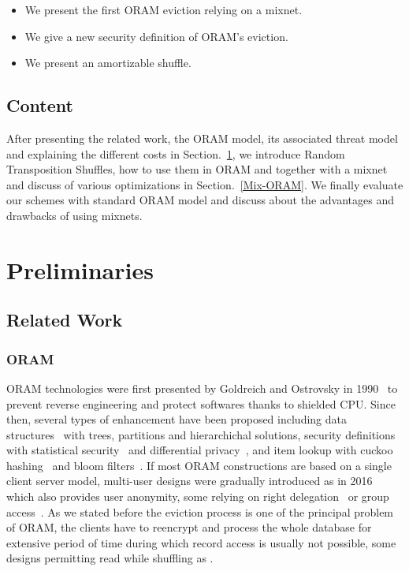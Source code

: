\documentclass[english,oneside,twocolumn]{article}
\begin{document}
\begin{itemize}
 \item We present the first ORAM eviction relying on a mixnet.
 \item We give a new security definition of ORAM's eviction. %
 \item We present an amortizable shuffle.
\end{itemize}

\subsection{Content}
After presenting the related work, the ORAM model, its associated threat model and explaining the different costs in Section.~\ref{Prelim}, we introduce Random Transposition Shuffles, how to use them in ORAM and together with a mixnet and discuss of various optimizations in Section.~\ref{Mix-ORAM}.
We finally evaluate our schemes with standard ORAM model and discuss about the advantages and drawbacks of using mixnets.

\section{Preliminaries}
\label{Prelim}

\subsection{Related Work}
\subsubsection{ORAM}
ORAM technologies were first presented by Goldreich and Ostrovsky in 1990~\cite{ostrovsky1990efficient} to prevent reverse engineering and protect softwares thanks to shielded CPU.
Since then, several types of enhancement have been proposed including data structures~\cite{goldreich1996software, stefanov2011towards, stefanov2013path, ren2014ring} with trees, partitions and hierarchichal solutions,
security definitions with statistical security~\cite{damgaard2011perfectly, ajtai2010oblivious} and differential privacy~\cite{wagh2016root}, and item lookup with cuckoo hashing~\cite{pinkas2010oblivious} and bloom filters~\cite{williams2008building}.
If most ORAM constructions are based on a single client server model, multi-user designs were gradually introduced as \cite{backesanonymous} in 2016 which also provides user anonymity, some relying on right delegation~\cite{franz2011oblivious} or group access~\cite{goodrich2012privacy}.
As we stated before the eviction process is one of the principal problem of ORAM, the clients have to reencrypt and process the whole database for extensive period of time during which record access is usually not possible, some designs permitting read while shuffling as \cite{boneh2011}.
\end{document}
